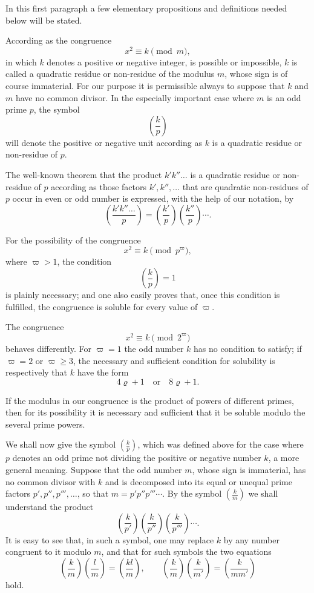 \documentclass[11pt]{article}
\newcommand{\J}[2]{\left(\frac{#1}{#2}\right)}
\begin{document}
In this first paragraph a few elementary propositions and definitions needed below will be stated.

According as the congruence
\[
 x^2\equiv k\pmod m,
\]
in which $k$ denotes a positive or negative integer, is possible or impossible, $k$ is called a quadratic residue or non-residue of the modulus $m$, whose sign is of course immaterial. For our purpose it is permissible always to suppose that $k$ and $m$ have no common divisor. In the especially important case where $m$ is an odd prime $p$, the symbol
\[
 \J{k}{p}
\]
will denote the positive or negative unit according as $k$ is a quadratic residue or non-residue of $p$.

The well-known theorem that the product $k'k''\ldots$ is a quadratic residue or non-residue of $p$ according as those factors $k',k'',\ldots$ that are quadratic non-residues of $p$ occur in even or odd number is expressed, with the help of our notation, by
\[
 \J{k'k''\ldots}{p}=\J{k'}{p}\J{k''}{p}\cdots.
\]

For the possibility of the congruence
\[
 x^2\equiv k\pmod {p^{\varpi}},
\]
where $\varpi>1$, the condition
\[
 \J{k}{p}=1
\]
is plainly necessary; and one also easily proves that, once this condition is fulfilled, the congruence is soluble for every value of $\varpi$.

The congruence
\[
 x^2\equiv k\pmod {2^{\varpi}}
\]
behaves differently. For $\varpi=1$ the odd number $k$ has no condition to satisfy; if $\varpi=2$ or $\varpi\geq3$, the necessary and sufficient condition for solubility is respectively that $k$ have the form
\[
 4\varrho+1\quad\text{or}\quad 8\varrho+1.
\]

If the modulus in our congruence is the product of powers of different primes, then for its possibility it is necessary and sufficient that it be soluble modulo the several prime powers.

We shall now give the symbol $\J{k}{p}$, which was defined above for the case where $p$ denotes an odd prime not dividing the positive or negative number $k$, a more general meaning. Suppose that the odd number $m$, whose sign is immaterial, has no common divisor with $k$ and is decomposed into its equal or unequal prime factors $p',p'',p''',\ldots$, so that $m=p'p''p'''\cdots$. By the symbol $\J{k}{m}$ we shall understand the product
\[
 \J{k}{p'}\J{k}{p''}\J{k}{p'''}\cdots.
\]
It is easy to see that, in such a symbol, one may replace $k$ by any number congruent to it modulo $m$, and that for such symbols the two equations
\[
 \J{k}{m}\J{l}{m}=\J{kl}{m},\qquad
 \J{k}{m}\J{k}{m'}=\J{k}{mm'}
\]
hold.
\end{document}
